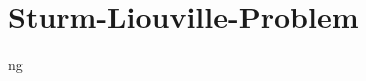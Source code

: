 %
%
%
\chapter{Sturm-Liouville-Problem\label{chapter:sturmliouville}}
\begin{refsection}




ng


\printbibliography[heading=subbibliography]
\end{refsection}
